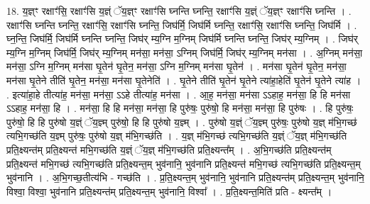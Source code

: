 \documentclass[17pt]{extarticle}
\begin{document}
18. य॒ज्ञ्ꣳ रक्षाꣳ॑सि॒ रक्षाꣳ॑सि य॒ज्ञ्ं ॅय॒ज्ञ्ꣳ रक्षाꣳ॑सि घ्नन्ति घ्नन्ति॒ रक्षाꣳ॑सि य॒ज्ञ्ं ॅय॒ज्ञ्ꣳ रक्षाꣳ॑सि घ्नन्ति । . रक्षाꣳ॑सि घ्नन्ति घ्नन्ति॒ रक्षाꣳ॑सि॒ रक्षाꣳ॑सि घ्नन्ति॒ जिघ॑र्मि॒ जिघ॑र्मि घ्नन्ति॒ रक्षाꣳ॑सि॒ रक्षाꣳ॑सि घ्नन्ति॒ जिघ॑र्मि । . घ्न॒न्ति॒ जिघ॑र्मि॒ जिघ॑र्मि घ्नन्ति घ्नन्ति॒ जिघ॑र् म्य॒ग्नि म॒ग्निम् जिघ॑र्मि घ्नन्ति घ्नन्ति॒ जिघ॑र् म्य॒ग्निम् । . जिघ॑र् म्य॒ग्नि म॒ग्निम् जिघ॑र्मि॒ जिघ॑र् म्य॒ग्निम् मन॑सा॒ मन॑सा॒ ऽग्निम् जिघ॑र्मि॒ जिघ॑र् म्य॒ग्निम् मन॑सा । . अ॒ग्निम् मन॑सा॒ मन॑सा॒ ऽग्नि म॒ग्निम् मन॑सा घृ॒तेन॑ घृ॒तेन॒ मन॑सा॒ ऽग्नि म॒ग्निम् मन॑सा घृ॒तेन॑ । . मन॑सा घृ॒तेन॑ घृ॒तेन॒ मन॑सा॒ मन॑सा घृ॒तेने तीति॑ घृ॒तेन॒ मन॑सा॒ मन॑सा घृ॒तेनेति॑ । . घृ॒तेने तीति॑ घृ॒तेन॑ घृ॒तेने त्या॑हा॒हेति॑ घृ॒तेन॑ घृ॒तेने त्या॑ह । . इत्या॑हा॒हे तीत्या॑ह॒ मन॑सा॒ मन॑सा॒ ऽऽहे तीत्या॑ह॒ मन॑सा । . आ॒ह॒ मन॑सा॒ मन॑सा ऽऽहाह॒ मन॑सा॒ हि हि मन॑सा ऽऽहाह॒ मन॑सा॒ हि । . मन॑सा॒ हि हि मन॑सा॒ मन॑सा॒ हि पुरु॑षः॒ पुरु॑षो॒ हि मन॑सा॒ मन॑सा॒ हि पुरु॑षः । . हि पुरु॑षः॒ पुरु॑षो॒ हि हि पुरु॑षो य॒ज्ञ्ं ॅय॒ज्ञ्म् पुरु॑षो॒ हि हि पुरु॑षो य॒ज्ञ्म् । . पुरु॑षो य॒ज्ञ्ं ॅय॒ज्ञ्म् पुरु॑षः॒ पुरु॑षो य॒ज्ञ् म॑भि॒गच्छ॑ त्यभि॒गच्छ॑ति य॒ज्ञ्म् पुरु॑षः॒ पुरु॑षो य॒ज्ञ् म॑भि॒गच्छ॑ति । . य॒ज्ञ् म॑भि॒गच्छ॑ त्यभि॒गच्छ॑ति य॒ज्ञ्ं ॅय॒ज्ञ् म॑भि॒गच्छ॑ति प्रति॒क्ष्यन्त॑म् प्रति॒क्ष्यन्त॑ मभि॒गच्छ॑ति य॒ज्ञ्ं ॅय॒ज्ञ् म॑भि॒गच्छ॑ति प्रति॒क्ष्यन्त᳚म् । . अ॒भि॒गच्छ॑ति प्रति॒क्ष्यन्त॑म् प्रति॒क्ष्यन्त॑ मभि॒गच्छ॑ त्यभि॒गच्छ॑ति प्रति॒क्ष्यन्त॒म् भुव॑नानि॒ भुव॑नानि प्रति॒क्ष्यन्त॑ मभि॒गच्छ॑ त्यभि॒गच्छ॑ति प्रति॒क्ष्यन्त॒म् भुव॑नानि । . अ॒भि॒गच्छ॒तीत्य॑भि - गच्छ॑ति । . प्र॒ति॒क्ष्यन्त॒म् भुव॑नानि॒ भुव॑नानि प्रति॒क्ष्यन्त॑म् प्रति॒क्ष्यन्त॒म् भुव॑नानि॒ विश्वा॒ विश्वा॒ भुव॑नानि प्रति॒क्ष्यन्त॑म् प्रति॒क्ष्यन्त॒म् भुव॑नानि॒ विश्वा᳚ । . प्र॒ति॒क्ष्यन्त॒मिति॑ प्रति - क्ष्यन्त᳚म् । \newline
\end{document}
